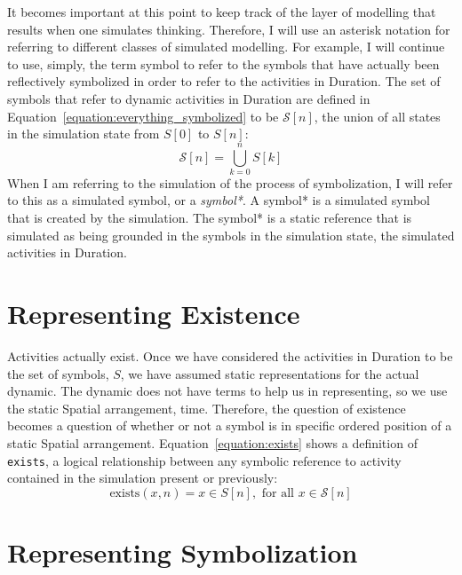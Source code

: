 It becomes important at this point to keep track of the layer of
modelling that results when one simulates thinking.  Therefore, I will
use an asterisk notation for referring to different classes of
simulated modelling.  For example, I will continue to use, simply, the
term symbol to refer to the symbols that have actually been
reflectively symbolized in order to refer to the activities in
Duration.  The set of symbols that refer to dynamic activities in
Duration are defined in Equation~\ref{equation:everything_symbolized}
to be $\mathcal{S}[n]$, the union of all states in the simulation
state from $S[0]$ to $S[n]$:
\begin{equation}
\label{equation:everything_symbolized}
\mathcal{S}[n] = \bigcup_{k=0}^n{S[k]}
\end{equation}
When I am referring to the simulation of the process of symbolization,
I will refer to this as a simulated symbol, or a \emph{symbol*}.  A
symbol* is a simulated symbol that is created by the simulation.  The
symbol* is a static reference that is simulated as being grounded in
the symbols in the simulation state, the simulated activities in
Duration.

\section{Representing Existence}

Activities actually exist.  Once we have considered the activities in
Duration to be the set of symbols, $S$, we have assumed static
representations for the actual dynamic.  The dynamic does not have
terms to help us in representing, so we use the static Spatial
arrangement, time.  Therefore, the question of existence becomes a
question of whether or not a symbol is in specific ordered position of
a static Spatial arrangement.  Equation~\ref{equation:exists} shows a
definition of {\tt exists}, a logical relationship between any
symbolic reference to activity contained in the simulation present or
previously:
\begin{equation}
\label{equation:exists}
\text{exists}(x, n) = x{\in}S[n], \text{ for all }x{\in}\mathcal{S}[n]
\end{equation}

\section{Representing Symbolization}

